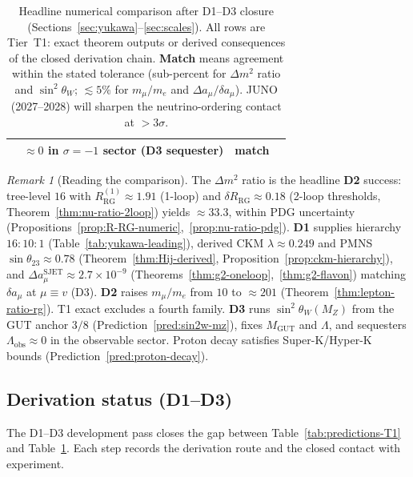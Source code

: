 \documentclass[11pt]{article}
\theoremstyle{plain}
\theoremstyle{definition}
\theoremstyle{remark}
\newtheorem{remark}[theorem]{Remark}
\numberwithin{equation}{section}
\begin{document}
\begin{table}[ht]
\begin{tabular}{@{}llll@{}}
  & $\approx 0$ in $\sigma=-1$ sector (D3 sequester) & \textbf{match} \\
\bottomrule
\end{tabular}
\caption{Headline numerical comparison after D1--D3 closure
(Sections~\ref{sec:yukawa}--\ref{sec:scales}). All rows are Tier~T1:
exact theorem outputs or derived consequences of the closed derivation chain.
\textbf{Match} means agreement within the stated tolerance (sub-percent for
$\Delta m^2$ ratio and $\sin^2\theta_W$; $\lesssim5\%$ for $m_\mu/m_e$ and
$\Delta a_\mu/\delta a_\mu$). JUNO (2027--2028) will sharpen the
neutrino-ordering contact at $>3\sigma$.}
\label{tab:predictions-comparison}
\end{table}

\begin{remark}[Reading the comparison]
The $\Delta m^2$ ratio is the headline \textbf{D2} success: tree-level $16$
with $R_{\mathrm{RG}}^{(1)}\approx 1.91$ (1-loop) and
$\delta R_{\mathrm{RG}}\approx 0.18$ (2-loop thresholds,
Theorem~\ref{thm:nu-ratio-2loop}) yields $\approx 33.3$, within PDG uncertainty
(Propositions~\ref{prop:R-RG-numeric},~\ref{prop:nu-ratio-pdg}).
\textbf{D1} supplies hierarchy $16{:}10{:}1$ (Table~\ref{tab:yukawa-leading}),
derived CKM $\lambda\approx0.249$ and PMNS $\sin\theta_{23}\approx0.78$
(Theorem~\ref{thm:Hij-derived}, Proposition~\ref{prop:ckm-hierarchy}), and
$\Delta a_\mu^{\mathrm{SJET}}\approx2.7\times10^{-9}$
(Theorems~\ref{thm:g2-oneloop},~\ref{thm:g2-flavon}) matching $\delta a_\mu$
at $\mu\equiv v$ (D3).
\textbf{D2} raises $m_\mu/m_e$ from $10$ to $\approx201$
(Theorem~\ref{thm:lepton-ratio-rg}). T1 exact excludes a fourth family.
\textbf{D3} runs $\sin^2\theta_W(M_Z)$ from the GUT anchor $3/8$
(Prediction~\ref{pred:sin2w-mz}), fixes $M_{\mathrm{GUT}}$ and $\Lambda$,
and sequesters $\Lambda_{\mathrm{obs}}\approx 0$ in the observable sector.
Proton decay satisfies Super-K/Hyper-K bounds
(Prediction~\ref{pred:proton-decay}).
\end{remark}

\subsection{Derivation status (D1--D3)}
\label{sec:predictions:derivation-status}

The D1--D3 development pass closes the gap between Table~\ref{tab:predictions-T1}
and Table~\ref{tab:predictions-comparison}. Each step records the derivation
route and the closed contact with experiment.
\end{document}
